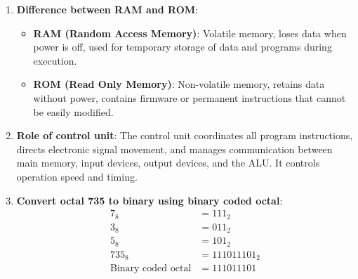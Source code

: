 \documentclass[12pt]{article}
\begin{document}
\begin{enumerate}[left=0pt, label=\bfseries Q\arabic*., start=1]
\begin{enumerate}[label=(\alph*)]
        \item \textbf{Difference between RAM and ROM}:
        \begin{itemize}
            \item \textbf{RAM (Random Access Memory)}: Volatile memory, loses data when power is off, used for temporary storage of data and programs during execution.
            \item \textbf{ROM (Read Only Memory)}: Non-volatile memory, retains data without power, contains firmware or permanent instructions that cannot be easily modified.
        \end{itemize}
        
        \item \textbf{Role of control unit}: The control unit coordinates all program instructions, directs electronic signal movement, and manages communication between main memory, input devices, output devices, and the ALU. It controls operation speed and timing.
        
        \item \textbf{Convert octal 735 to binary using binary coded octal}:
        \begin{align*}
        7_{8} &= 111_2 \\
        3_{8} &= 011_2 \\
        5_{8} &= 101_2 \\
        735_{8} &= 111011101_2 \\
        \text{Binary coded octal} &= \boxed{111011101}
        \end{align*}
    \end{enumerate}
\end{enumerate}
\end{document}
